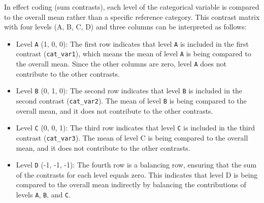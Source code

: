 \documentclass[
  letterpaper,
]{book}
\newenvironment{Shaded}{\begin{snugshade}}{\end{snugshade}}
\newcommand{\CommentTok}[1]{\textcolor[rgb]{0.37,0.37,0.37}{#1}}
\newcommand{\DecValTok}[1]{\textcolor[rgb]{0.68,0.00,0.00}{#1}}
\newcommand{\FunctionTok}[1]{\textcolor[rgb]{0.28,0.35,0.67}{#1}}
\newcommand{\NormalTok}[1]{\textcolor[rgb]{0.00,0.23,0.31}{#1}}
\newcommand{\OtherTok}[1]{\textcolor[rgb]{0.00,0.23,0.31}{#1}}
\newcommand{\SpecialCharTok}[1]{\textcolor[rgb]{0.37,0.37,0.37}{#1}}
\providecommand{\tightlist}{%
  \setlength{\itemsep}{0pt}\setlength{\parskip}{0pt}}\usepackage{longtable,booktabs,array}
\begin{document}
\begin{Shaded}
\end{Shaded}

In effect coding (sum contrasts), each level of the categorical variable
is compared to the overall mean rather than a specific reference
category. This contrast matrix with four levels (A, B, C, D) and three
columns can be interpreted as follows:

\begin{itemize}
\tightlist
\item
  Level \texttt{A} (1, 0, 0): The first row indicates that level
  \texttt{A} is included in the first contrast (\texttt{cat\_var1}),
  which means the mean of level \texttt{A} is being compared to the
  overall mean. Since the other columns are zero, level \texttt{A} does
  not contribute to the other contrasts.
\item
  Level \texttt{B} (0, 1, 0): The second row indicates that level
  \texttt{B} is included in the second contrast (\texttt{cat\_var2}).
  The mean of level \texttt{B} is being compared to the overall mean,
  and it does not contribute to the other contrasts.
\item
  Level \texttt{C} (0, 0, 1): The third row indicates that level
  \texttt{C} is included in the third contrast (\texttt{cat\_var3}). The
  mean of level C is being compared to the overall mean, and it does not
  contribute to the other contrasts.
\item
  Level \texttt{D} (-1, -1, -1): The fourth row is a balancing row,
  ensuring that the sum of the contrasts for each level equals zero.
  This indicates that level D is being compared to the overall mean
  indirectly by balancing the contributions of levels \texttt{A},
  \texttt{B}, and \texttt{C}.
\end{itemize}
\end{document}
